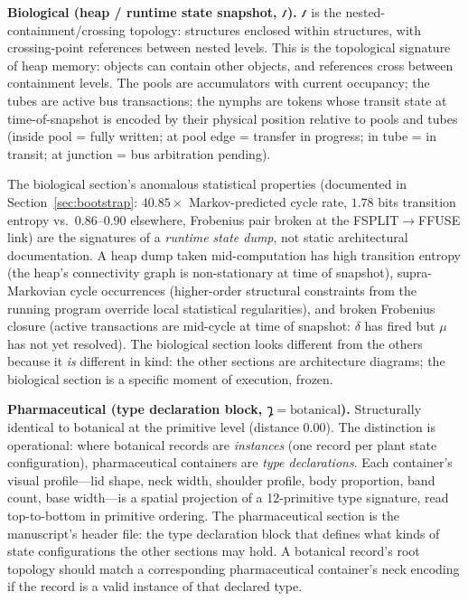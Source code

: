 \documentclass[12pt,a4paper]{article}
\begin{document}
\textbf{Biological (heap / runtime state snapshot, $𐑥$).} $𐑥$ is the nested-containment/crossing topology: structures enclosed within structures, with crossing-point references between nested levels. This is the topological signature of heap memory: objects can contain other objects, and references cross between containment levels. The pools are accumulators with current occupancy; the tubes are active bus transactions; the nymphs are tokens whose transit state at time-of-snapshot is encoded by their physical position relative to pools and tubes (inside pool = fully written; at pool edge = transfer in progress; in tube = in transit; at junction = bus arbitration pending).

The biological section's anomalous statistical properties (documented in Section~\ref{sec:bootstrap}: $40.85\times$ Markov-predicted cycle rate, $1.78$ bits transition entropy vs.\ $0.86$--$0.90$ elsewhere, Frobenius pair broken at the FSPLIT$\to$FFUSE link) are the signatures of a \emph{runtime state dump}, not static architectural documentation. A heap dump taken mid-computation has high transition entropy (the heap's connectivity graph is non-stationary at time of snapshot), supra-Markovian cycle occurrences (higher-order structural constraints from the running program override local statistical regularities), and broken Frobenius closure (active transactions are mid-cycle at time of snapshot: $\delta$ has fired but $\mu$ has not yet resolved). The biological section looks different from the others because it \emph{is} different in kind: the other sections are architecture diagrams; the biological section is a specific moment of execution, frozen.

\textbf{Pharmaceutical (type declaration block, $𐑡 = \text{botanical}$).} Structurally identical to botanical at the primitive level (distance 0.00). The distinction is operational: where botanical records are \emph{instances} (one record per plant state configuration), pharmaceutical containers are \emph{type declarations}. Each container's visual profile---lid shape, neck width, shoulder profile, body proportion, band count, base width---is a spatial projection of a 12-primitive type signature, read top-to-bottom in primitive ordering. The pharmaceutical section is the manuscript's header file: the type declaration block that defines what kinds of state configurations the other sections may hold. A botanical record's root topology should match a corresponding pharmaceutical container's neck encoding if the record is a valid instance of that declared type.
\end{document}
